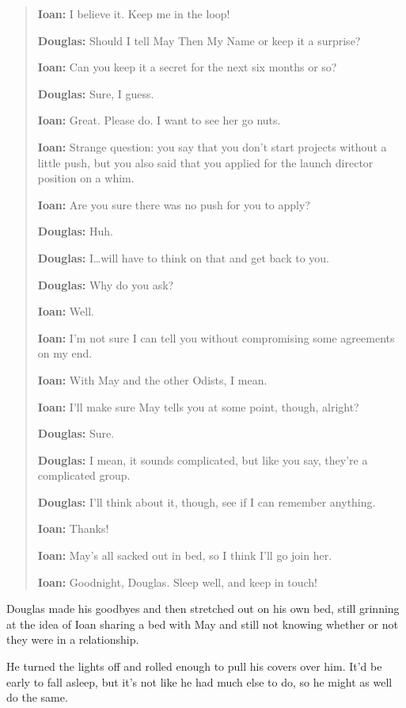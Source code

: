 \begin{quote}
\textbf{Ioan:} I believe it. Keep me in the loop!

\textbf{Douglas:} Should I tell May Then My Name or keep it a surprise?

\textbf{Ioan:} Can you keep it a secret for the next six months or so?

\textbf{Douglas:} Sure, I guess.

\textbf{Ioan:} Great. Please do. I want to see her go nuts.

\textbf{Ioan:} Strange question: you say that you don't start projects without a little push, but you also said that you applied for the launch director position on a whim.

\textbf{Ioan:} Are you sure there was no push for you to apply?

\textbf{Douglas:} Huh.

\textbf{Douglas:} I\ldots will have to think on that and get back to you.

\textbf{Douglas:} Why do you ask?

\textbf{Ioan:} Well.

\textbf{Ioan:} I'm not sure I can tell you without compromising some agreements on my end.

\textbf{Ioan:} With May and the other Odists, I mean.

\textbf{Ioan:} I'll make sure May tells you at some point, though, alright?

\textbf{Douglas:} Sure.

\textbf{Douglas:} I mean, it sounds complicated, but like you say, they're a complicated group.

\textbf{Douglas:} I'll think about it, though, see if I can remember anything.

\textbf{Ioan:} Thanks!

\textbf{Ioan:} May's all sacked out in bed, so I think I'll go join her.

\textbf{Ioan:} Goodnight, Douglas. Sleep well, and keep in touch!
\end{quote}

\noindent Douglas made his goodbyes and then stretched out on his own bed, still grinning at the idea of Ioan sharing a bed with May and still not knowing whether or not they were in a relationship.

He turned the lights off and rolled enough to pull his covers over him. It'd be early to fall asleep, but it's not like he had much else to do, so he might as well do the same.
